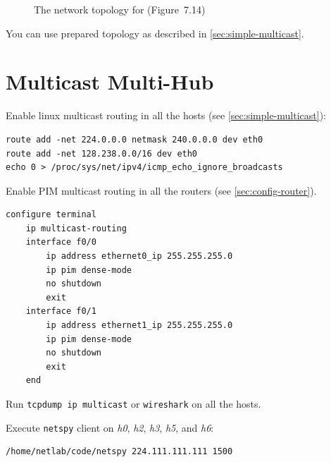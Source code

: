 \documentclass{../UTNetLab}
\begin{document}
\begin{figure}[H]
        \caption{The network topology for  (Figure~7.14)}
        \label{fig:7.14}
    \end{figure}

    You can use prepared topology as described in \autoref{sec:simple-multicast}.

\section{Multicast Multi-Hub\label{sec:multi-hub}}
    Enable linux multicast routing in all the hosts (see \autoref{sec:simple-multicast}):
    \begin{lstlisting}[emph={eth0}]
route add -net 224.0.0.0 netmask 240.0.0.0 dev eth0
route add -net 128.238.0.0/16 dev eth0
echo 0 > /proc/sys/net/ipv4/icmp_echo_ignore_broadcasts
    \end{lstlisting}

    Enable PIM multicast routing in all the routers (see \autoref{sec:config-router}). 
    \begin{lstlisting}[language={cisco}, emph={ethernet0_ip, ethernet1_ip}]
configure terminal
    ip multicast-routing
    interface f0/0
        ip address ethernet0_ip 255.255.255.0
        ip pim dense-mode
        no shutdown
        exit
    interface f0/1
        ip address ethernet1_ip 255.255.255.0
        ip pim dense-mode
        no shutdown
        exit
    end
    \end{lstlisting}

    Run \lstinline{tcpdump ip multicast} or \lstinline{wireshark} on all the hosts. 

    Execute \lstinline{netspy} client on \textit{h0}, \textit{h2}, \textit{h3}, \textit{h5}, and \textit{h6}:
    \begin{lstlisting}
/home/netlab/code/netspy 224.111.111.111 1500
    \end{lstlisting}
\end{document}
